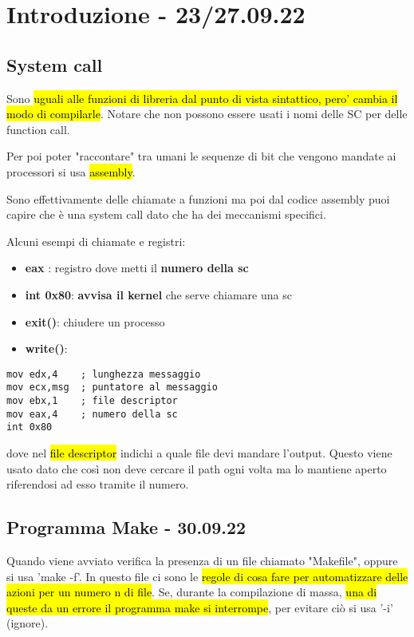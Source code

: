\newpage
\section{Introduzione - 23/27.09.22}

\subsection{System call}

Sono \hl{uguali alle funzioni di libreria dal punto di vista sintattico, pero' cambia il modo di compilarle}. Notare che non possono essere usati i nomi delle SC per delle function call.

Per poi poter "raccontare" tra umani le sequenze di bit che vengono mandate ai processori si usa \hl{assembly}.

Sono effettivamente delle chiamate a funzioni ma poi dal codice assembly puoi capire che è una system call dato che ha dei meccanismi specifici.

Alcuni esempi di chiamate e registri:
\begin{itemize}
	\item \textbf{eax} : registro dove metti il \textbf{numero della sc}
	\item \textbf{int 0x80}: \textbf{avvisa il kernel} che serve chiamare una sc
	\item \textbf{exit()}: chiudere un processo
	\item \textbf{write()}:
\end{itemize}

\begin{lstlisting}
mov edx,4    ; lunghezza messaggio
mov ecx,msg  ; puntatore al messaggio
mov ebx,1    ; file descriptor
mov eax,4    ; numero della sc
int 0x80	
\end{lstlisting}

dove nel \hl{file descriptor} indichi a quale file devi mandare l'output. Questo viene usato dato che così non deve cercare il path ogni volta ma lo mantiene aperto riferendosi ad esso tramite il numero.


\subsection{Programma Make - 30.09.22}

Quando viene avviato verifica la presenza di un file chiamato "Makefile", oppure si usa 'make -f'. In questo file ci sono le \hl{regole di cosa fare per automatizzare delle azioni per un numero n di file}. Se, durante la compilazione di massa, \hl{una di queste da un errore il programma make si interrompe}, per evitare ciò si usa '-i' (ignore).

